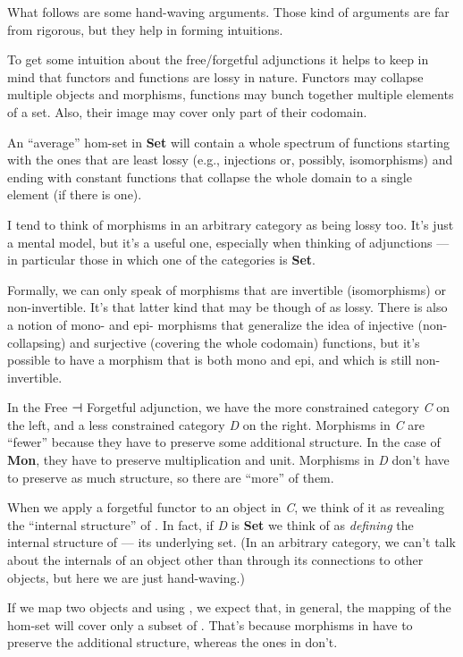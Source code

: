 What follows are some hand-waving arguments. Those kind of arguments are
far from rigorous, but they help in forming intuitions.

To get some intuition about the free/forgetful adjunctions it helps to
keep in mind that functors and functions are lossy in nature. Functors
may collapse multiple objects and morphisms, functions may bunch
together multiple elements of a set. Also, their image may cover only
part of their codomain.

An ``average'' hom-set in \textbf{Set} will contain a whole spectrum of
functions starting with the ones that are least lossy (e.g., injections
or, possibly, isomorphisms) and ending with constant functions that
collapse the whole domain to a single element (if there is one).

I tend to think of morphisms in an arbitrary category as being lossy
too. It's just a mental model, but it's a useful one, especially when
thinking of adjunctions --- in particular those in which one of the
categories is \textbf{Set}.

Formally, we can only speak of morphisms that are invertible
(isomorphisms) or non-invertible. It's that latter kind that may be
though of as lossy. There is also a notion of mono- and epi- morphisms
that generalize the idea of injective (non-collapsing) and surjective
(covering the whole codomain) functions, but it's possible to have a
morphism that is both mono and epi, and which is still non-invertible.

In the Free ⊣ Forgetful adjunction, we have the more constrained
category \emph{C} on the left, and a less constrained category \emph{D}
on the right. Morphisms in \emph{C} are ``fewer'' because they have to
preserve some additional structure. In the case of \textbf{Mon}, they
have to preserve multiplication and unit. Morphisms in \emph{D} don't
have to preserve as much structure, so there are ``more'' of them.

When we apply a forgetful functor  to an object  in
\emph{C}, we think of it as revealing the ``internal structure'' of
. In fact, if \emph{D} is \textbf{Set} we think of 
as \emph{defining} the internal structure of  --- its
underlying set. (In an arbitrary category, we can't talk about the
internals of an object other than through its connections to other
objects, but here we are just hand-waving.)

If we map two objects  and  using ,
we expect that, in general, the mapping of the hom-set
 will cover only a subset of
. That's because morphisms in
 have to preserve the additional structure,
whereas the ones in  don't.

